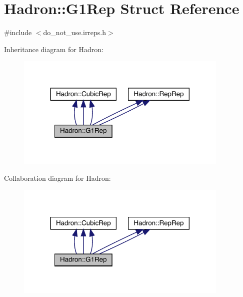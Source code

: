 \hypertarget{structHadron_1_1G1Rep}{}\section{Hadron\+:\+:G1\+Rep Struct Reference}
\label{structHadron_1_1G1Rep}


{\ttfamily \#include $<$do\+\_\+not\+\_\+use.\+irreps.\+h$>$}



Inheritance diagram for Hadron\+:
\nopagebreak
\begin{figure}[H]
\begin{center}
\leavevmode
\includegraphics[width=288pt]{d5/d2d/structHadron_1_1G1Rep__inherit__graph}
\end{center}
\end{figure}


Collaboration diagram for Hadron\+:
\nopagebreak
\begin{figure}[H]
\begin{center}
\leavevmode
\includegraphics[width=288pt]{d5/d5e/structHadron_1_1G1Rep__coll__graph}
\end{center}
\end{figure}
